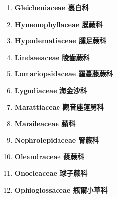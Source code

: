 \begin{enumerate}
        
      \item[] \begin{small}\textbf{Gleicheniaceae 裏白科} \end{small}
        
      \item[] \begin{small}\textbf{Hymenophyllaceae 膜蕨科} \end{small}
        
      \item[] \begin{small}\textbf{Hypodematiaceae 腫足蕨科} \end{small}
        
      \item[] \begin{small}\textbf{Lindsaeaceae 陵齒蕨科} \end{small}
        
      \item[] \begin{small}\textbf{Lomariopsidaceae 羅蔓藤蕨科} \end{small}
        
      \item[] \begin{small}\textbf{Lygodiaceae 海金沙科} \end{small}
        
      \item[] \begin{small}\textbf{Marattiaceae 觀音座蓮舅科} \end{small}
        
      \item[] \begin{small}\textbf{Marsileaceae 蘋科} \end{small}
        
      \item[] \begin{small}\textbf{Nephrolepidaceae 腎蕨科} \end{small}
        
      \item[] \begin{small}\textbf{Oleandraceae 蓧蕨科} \end{small}
        
      \item[] \begin{small}\textbf{Onocleaceae 球子蕨科} \end{small}
        
      \item[] \begin{small}\textbf{Ophioglossaceae 瓶爾小草科} \end{small}

\end{enumerate}
